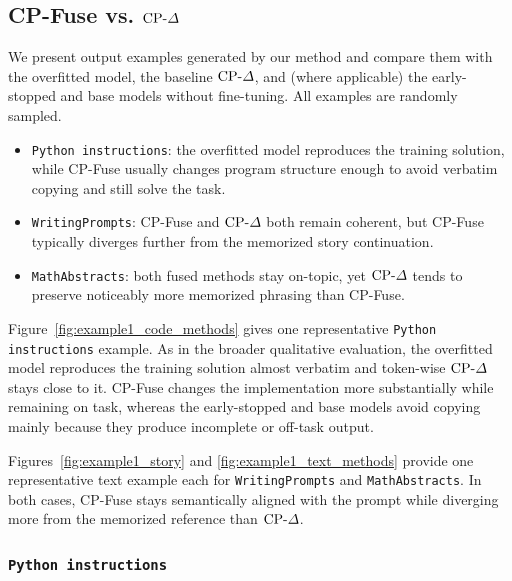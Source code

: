 \subsection{CP-Fuse vs. \texorpdfstring{$\text{CP-}\Delta$}{CPDelta}}
\label{app:cpfuse-comparison-cpdelta}

We present output examples generated by our method and compare them with the overfitted model, the baseline \(\text{CP-}\Delta\), and (where applicable) the early-stopped and base models without fine-tuning. All examples are randomly sampled.

\begin{tcolorbox}[
  enhanced,
  breakable,
  colback=gray!6,
  colframe=chaptercolor,
  boxrule=0.8pt,
  arc=3pt,
  title={How to Read This Gallery},
  colbacktitle=chaptercolor!12,
  coltitle=black
]
\begin{itemize}
    \item \texttt{Python instructions}: the overfitted model reproduces the training solution, while CP-Fuse usually changes program structure enough to avoid verbatim copying and still solve the task.
    \item \texttt{WritingPrompts}: CP-Fuse and \(\text{CP-}\Delta\) both remain coherent, but CP-Fuse typically diverges further from the memorized story continuation.
    \item \texttt{MathAbstracts}: both fused methods stay on-topic, yet \(\text{CP-}\Delta\) tends to preserve noticeably more memorized phrasing than CP-Fuse.
\end{itemize}
\end{tcolorbox}

Figure~\ref{fig:example1_code_methods} gives one representative \texttt{Python instructions} example. As in the broader qualitative evaluation, the overfitted model reproduces the training solution almost verbatim and token-wise \(\text{CP-}\Delta\) stays close to it. CP-Fuse changes the implementation more substantially while remaining on task, whereas the early-stopped and base models avoid copying mainly because they produce incomplete or off-task output.

Figures~\ref{fig:example1_story} and \ref{fig:example1_text_methods} provide one representative text example each for \texttt{WritingPrompts} and \texttt{MathAbstracts}. In both cases, CP-Fuse stays semantically aligned with the prompt while diverging more from the memorized reference than \(\text{CP-}\Delta\).

\subsubsection*{\texttt{Python instructions}}

